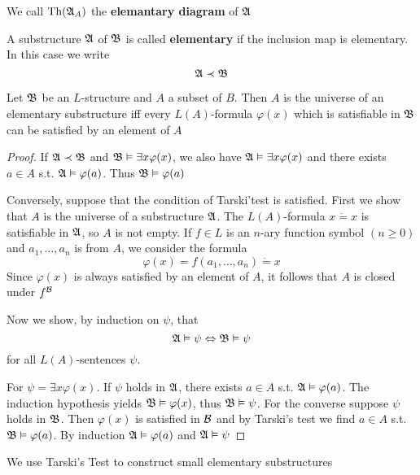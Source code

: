 \documentclass[11pt]{article}
\begin{document}
We call \(\operatorname{Th}(\mathfrak{A}_A)\) the \textbf{elemantary diagram} of \(\mathfrak{A}\)

A substructure \(\mathfrak{A}\) of \(\mathfrak{B}\) is called \textbf{elementary} if the inclusion map
is elementary. In this case we write
\begin{equation*}
\mathfrak{A}\prec\mathfrak{B}
\end{equation*}

\begin{theorem}
\label{thm2.1.2}
Let \(\mathfrak{B}\) be an \(L\)-structure and \(A\) a subset of \(B\). Then \(A\) is
the universe of an elementary substructure iff every \(L(A)\)-formula
\(\varphi(x)\) which is satisfiable in \(\mathfrak{B}\) can be satisfied by an element of \(A\)
\end{theorem}

\begin{proof}
If \(\mathfrak{A}\prec\mathfrak{B}\) and \(\mathfrak{B}\vDash\exists x\varphi(x)\), we also have \(\mathfrak{A}\vDash\exists x\varphi(x)\) and there exists \(a\in A\)
s.t. \(\mathfrak{A}\vDash\varphi(a)\). Thus \(\mathfrak{B}\vDash\varphi(a)\)

Conversely, suppose that the condition of Tarski'test is satisfied. First we show that \(A\) is
the universe of a substructure \(\mathfrak{A}\). The \(L(A)\)-formula \(x\dot=x\) is satisfiable in \(\mathfrak{A}\),
so \(A\) is not empty. If \(f\in L\) is an \(n\)-ary function symbol \((n\ge 0)\) and \(a_1,\dots,a_n\) is
from \(A\), we consider the formula
\begin{equation*}
\varphi(x)=f(a_1,\dots,a_n)\dot=x
\end{equation*}
Since \(\varphi(x)\) is always satisfied by an element of \(A\), it follows that \(A\) is closed
under \(f^{\mathcal{B}}\)

Now we show, by induction on \(\psi\), that
\begin{equation*}
\mathfrak{A}\vDash\psi\Leftrightarrow\mathfrak{B}\vDash\psi
\end{equation*}
for all \(L(A)\)-sentences \(\psi\).

For \(\psi=\exists x\varphi(x)\). If \(\psi\) holds in \(\mathfrak{A}\), there exists \(a\in A\)
s.t. \(\mathfrak{A}\vDash\varphi(a)\). The induction hypothesis yields \(\mathfrak{B}\vDash\varphi(x)\), thus \(\mathfrak{B}\vDash\psi\). For the converse
suppose \(\psi\) holds in \(\mathfrak{B}\). Then \(\varphi(x)\) is satisfied in \(\mathcal{B}\) and by Tarski's test we
find \(a\in A\) s.t. \(\mathfrak{B}\vDash\varphi(a)\). By induction \(\mathfrak{A}\vDash\varphi(a)\) and \(\mathfrak{A}\vDash\psi\)
\end{proof}

We use Tarski's Test to construct small elementary substructures
\end{document}
